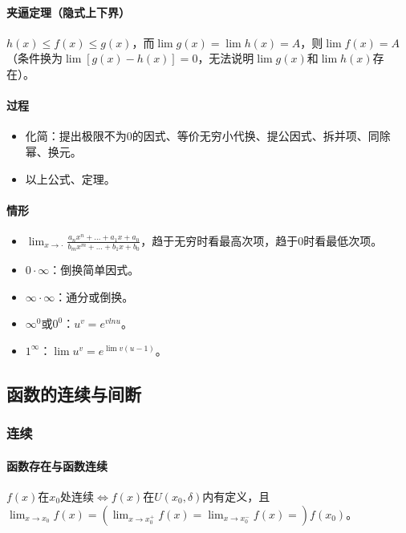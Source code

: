 \documentclass[
12pt, %
a4paper, 
oneside, %
headinclude,footinclude, %
]{scrartcl}
\begin{document}
\paragraph{夹逼定理（隐式上下界）}
$ h(x) \leq f(x) \leq g(x) $，而$ \lim g(x) = \lim h(x) = A $，则$ \lim f(x) = A $（条件换为$ \lim [g(x) - h(x)] = 0 $，无法说明$ \lim g(x) $和$ \lim h(x) $存在）。
\paragraph{过程}
\begin{itemize}
\item 化简：提出极限不为$ 0 $的因式、等价无穷小代换、提公因式、拆并项、同除幂、换元。
\item 以上公式、定理。
\end{itemize}
\paragraph{情形}
\begin{itemize}
\item $ \lim_{x \to \cdot} \frac{a_n x^n + \dots + a_1x + a_0}{b_m x^m + \dots + b_1x + b_0} $，趋于无穷时看最高次项，趋于0时看最低次项。
\item $ 0 \cdot \infty $：倒换简单因式。
\item $ \infty \cdot \infty $：通分或倒换。
\item $ \infty^0 $或$ 0^0 $：$ u^{v} = e^{vlnu} $。
\item $ 1^\infty $：$ \lim u^{v} = e^{\lim v(u - 1)} $。
\end{itemize}
\subsection[函数的连续与间断]{函数的连续与间断}
\subsubsection[连续]{连续}
\paragraph{函数存在与函数连续}
$ f(x) $在$ x_0 $处连续$ \Leftrightarrow $$ f(x) $在$ U(x_0, \delta) $内有定义，且\\$ \lim_{x \to x_0}f(x) = (\lim_{x \to x_0^+}f(x) = \lim_{x \to x_0^-}f(x) =) f(x_0) $。
\end{document}
